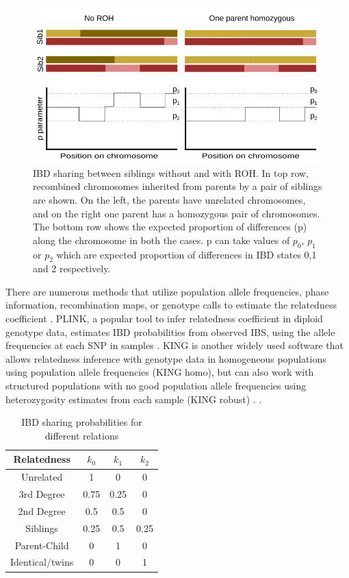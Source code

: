 \documentclass[12pt, letterpaper]{article}
\begin{document}
\begin{figure}[h!]
    \includegraphics[width=18cm]{plots/inkscape_finalImg/schematic_sib.png}
    \centering
    \caption{IBD sharing between siblings without and with ROH. In top row, recombined chromosomes inherited from parents by a pair of siblings are shown. On the left, the parents have unrelated chromosomes, and on the right one parent has a homozygous pair of chromosomes. The bottom row shows the expected proportion of differences (p) along the chromosome in both the cases. p can take values of $p_0$, $p_1$ or $p_2$ which are expected proportion of differences in IBD states 0,1 and 2 respectively.  }
    \label{fig0:schematic}
\end{figure}


There are numerous methods that utilize population allele frequencies, phase information, recombination maps, or genotype calls to estimate the relatedness coefficient \cite{huff_maximum-likelihood_2011,li_relationship_2014,li_accurate_2014,thornton_estimating_2012}. PLINK, a popular tool to infer relatedness coefficient in diploid genotype data, estimates IBD probabilities from observed IBS, using the allele frequencies at each SNP in samples \cite{purcell_plink_2007}. KING is another widely used software that allows relatedness inference with genotype data in homogeneous populations using population allele frequencies (KING homo), but can also work with structured populations with no good population allele frequencies using heterozygosity estimates from each sample (KING robust) \cite{manichaikul_robust_2010}. . 

\begin{table}
\caption{\label{tab:Table 1}IBD sharing probabilities for different relations}
\begin{tabular}{|c|c|c|c|}
    \hline
    Relatedness & $k_0$ & $k_1$ & $k_2$\\
    \hline
    Unrelated & 1 & 0 & 0\\
    \hline
    3rd Degree & 0.75 & 0.25 & 0\\
    \hline
    2nd Degree & 0.5 & 0.5 & 0\\
    \hline
    Siblings & 0.25 & 0.5 & 0.25\\
    \hline
    Parent-Child & 0 & 1 & 0\\
    \hline
    Identical/twins & 0 & 0 & 1\\
    \hline
\end{tabular}
\label{table1}
\end{table}
\end{document}
